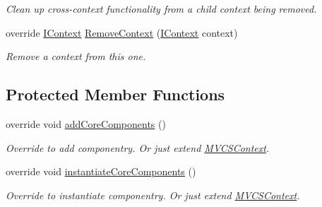 \begin{DoxyCompactItemize}
\begin{DoxyCompactList}\small\item\em Clean up cross-\/context functionality from a child context being removed. \end{DoxyCompactList}\item 
\hypertarget{classstrange_1_1extensions_1_1context_1_1impl_1_1_cross_context_a9d89f38a223f4e3e6c9f5142bcb5c0b1}{override \hyperlink{interfacestrange_1_1extensions_1_1context_1_1api_1_1_i_context}{I\-Context} \hyperlink{classstrange_1_1extensions_1_1context_1_1impl_1_1_cross_context_a9d89f38a223f4e3e6c9f5142bcb5c0b1}{Remove\-Context} (\hyperlink{interfacestrange_1_1extensions_1_1context_1_1api_1_1_i_context}{I\-Context} context)}\label{classstrange_1_1extensions_1_1context_1_1impl_1_1_cross_context_a9d89f38a223f4e3e6c9f5142bcb5c0b1}

\begin{DoxyCompactList}\small\item\em Remove a context from this one. \end{DoxyCompactList}\end{DoxyCompactItemize}
\subsection*{Protected Member Functions}
\begin{DoxyCompactItemize}
\item 
\hypertarget{classstrange_1_1extensions_1_1context_1_1impl_1_1_cross_context_a93b6bb362ee0dd4e26f598667bb94c78}{override void \hyperlink{classstrange_1_1extensions_1_1context_1_1impl_1_1_cross_context_a93b6bb362ee0dd4e26f598667bb94c78}{add\-Core\-Components} ()}\label{classstrange_1_1extensions_1_1context_1_1impl_1_1_cross_context_a93b6bb362ee0dd4e26f598667bb94c78}

\begin{DoxyCompactList}\small\item\em Override to add componentry. Or just extend \hyperlink{classstrange_1_1extensions_1_1context_1_1impl_1_1_m_v_c_s_context}{M\-V\-C\-S\-Context}. \end{DoxyCompactList}\item 
\hypertarget{classstrange_1_1extensions_1_1context_1_1impl_1_1_cross_context_a0983ddcfb551f76e2a15660d24c93dd8}{override void \hyperlink{classstrange_1_1extensions_1_1context_1_1impl_1_1_cross_context_a0983ddcfb551f76e2a15660d24c93dd8}{instantiate\-Core\-Components} ()}\label{classstrange_1_1extensions_1_1context_1_1impl_1_1_cross_context_a0983ddcfb551f76e2a15660d24c93dd8}

\begin{DoxyCompactList}\small\item\em Override to instantiate componentry. Or just extend \hyperlink{classstrange_1_1extensions_1_1context_1_1impl_1_1_m_v_c_s_context}{M\-V\-C\-S\-Context}. \end{DoxyCompactList}\end{DoxyCompactItemize}
